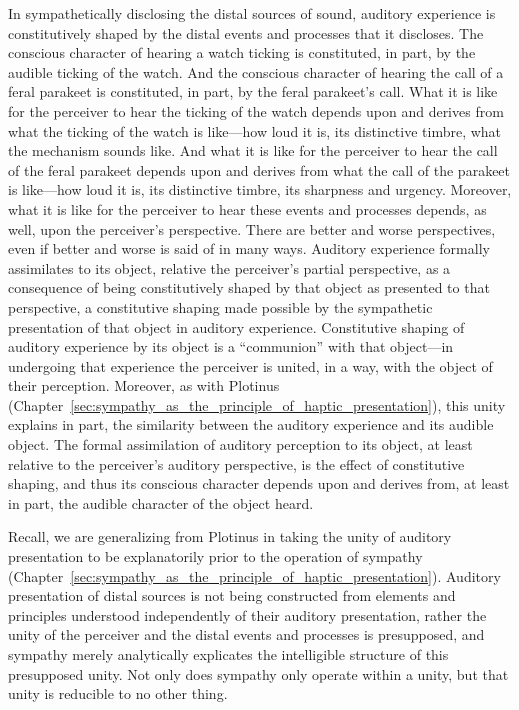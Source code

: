 In sympathetically disclosing the distal sources of sound, auditory experience is constitutively shaped by the distal events and processes that it discloses. The conscious character of hearing a watch ticking is constituted, in part, by the audible ticking of the watch. And the conscious character of hearing the call of a feral parakeet is constituted, in part, by the feral parakeet's call. What it is like for the perceiver to hear the ticking of the watch depends upon and derives from what the ticking of the watch is like---how loud it is, its distinctive timbre, what the mechanism sounds like. And what it is like for the perceiver to hear the call of the feral parakeet depends upon and derives from what the call of the parakeet is like---how loud it is, its distinctive timbre, its sharpness and urgency. Moreover, what it is like for the perceiver to hear these events and processes depends, as well, upon the perceiver's perspective. There are better and worse perspectives, even if better and worse is said of in many ways. Auditory experience formally assimilates to its object, relative the perceiver's partial perspective, as a consequence of being constitutively shaped by that object as presented to that perspective, a constitutive shaping made possible by the sympathetic presentation of that object in auditory experience. Constitutive shaping of auditory experience by its object is a ``communion'' with that object---in undergoing that experience the perceiver is united, in a way, with the object of their perception. Moreover, as with Plotinus (Chapter~\ref{sec:sympathy_as_the_principle_of_haptic_presentation}), this unity explains in part, the similarity between the auditory experience and its audible object. The formal assimilation of auditory perception to its object, at least relative to the perceiver's auditory perspective, is the effect of constitutive shaping, and thus its conscious character depends upon and derives from, at least in part, the audible character of the object heard.

Recall, we are generalizing from Plotinus in taking the unity of auditory presentation to be explanatorily prior to the operation of sympathy (Chapter~\ref{sec:sympathy_as_the_principle_of_haptic_presentation}). Auditory presentation of distal sources is not being constructed from elements and principles understood independently of their auditory presentation, rather the unity of the perceiver and the distal events and processes is presupposed, and sympathy merely analytically explicates the intelligible structure of this presupposed unity. Not only does sympathy only operate within a unity, but that unity is reducible to no other thing.

